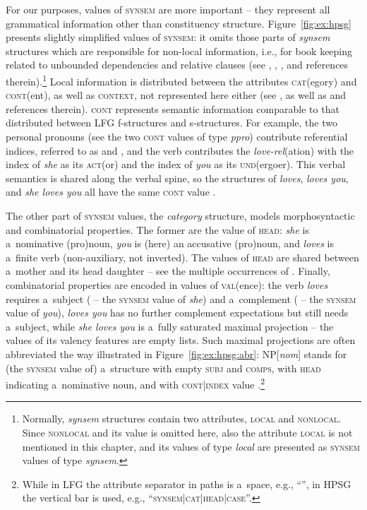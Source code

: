 \documentclass[output=paper,hidelinks]{langscibook}
\begin{document}
For our purposes, values of \textsc{synsem} are more important -- they represent all grammatical information other than constituency structure.  Figure~\ref{fig:ex:hpsg} presents slightly simplified values of \textsc{synsem}: it omits those parts of \textit{synsem} structures which are responsible for non-local information, i.e., for book keeping related to unbounded dependencies and relative clauses (see \citealt{bor:cry:20}, \citealt{arn:god:20}, \citealt{chav:20}, and references therein).\footnote{Normally, \textit{synsem} structures contain two attributes, \textsc{local} and \textsc{nonlocal}.  Since \textsc{nonlocal} and its value is omitted here, also the attribute \textsc{local} is not mentioned in this chapter, and its values of type \textit{local} are presented as \textsc{synsem} values of type \textit{synsem}.}  Local information is distributed between the attributes \textsc{cat}(egory) and \textsc{cont}(ent), as well as \textsc{context}, not represented here either (see \citealt[332--337]{pollard1994head-driven}, as well as \citealt{deku:20} and references therein).  \textsc{cont} represents semantic information comparable to that distributed between LFG f-structures and s-structures.  For example, the two personal pronouns (see the two \textsc{cont} values of type \textit{ppro}) contribute referential indices, referred to as  and , and the verb contributes the \textit{love-rel}(ation) with the index  of \emph{she} as its \textsc{act}(or) and the index  of \emph{you} as its \textsc{und}(ergoer).  This verbal semantics is shared along the verbal spine, so the structures of \emph{loves}, \emph{loves you}, and \emph{she loves you} all have the same \textsc{cont} value . 

The other part of \textsc{synsem} values, the \textit{category} structure, models morphosyntactic and combinatorial properties.  The former are the value of \textsc{head}: \emph{she} is a~nominative (pro)noun, \emph{you} is (here) an accusative (pro)noun, and \emph{loves} is a~finite verb (non-auxiliary, not inverted).  The values of \textsc{head} are shared between a~mother and its head daughter -- see the multiple occurrences of .  Finally, combinatorial properties are encoded in values of \textsc{val}(ence): the verb \emph{loves} requires a~subject ( -- the \textsc{synsem} value of \emph{she}) and a~complement ( -- the \textsc{synsem} value of \emph{you}), \emph{loves you} has no further complement expectations but still needs a~subject, while \emph{she loves you} is a~fully saturated maximal projection -- the values of its valency features are empty lists.  Such maximal projections are often abbreviated the way illustrated in Figure~\ref{fig:ex:hpsg:abr}: NP[\textit{nom}]\textsubscript{\avm{\3}} stands for (the \textsc{synsem} value of) a~structure with empty \textsc{subj} and \textsc{comps}, with \textsc{head} indicating a~nominative noun, and with \textsc{cont|index} value .\footnote{While in LFG the attribute separator in paths is a~space, e.g., “”, in HPSG the vertical bar is used, e.g., “\textsc{synsem|cat|head|case}”.}
\end{document}
